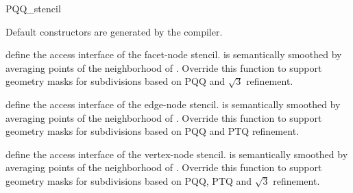 \begin{ccRefClass}{PQQ_stencil}







\ccCreation

Default constructors are generated by the compiler.


\ccThree{}{}{}

{define the access interface of the facet-node stencil. 
 is semantically smoothed by averaging points of the
neighborhood of .
Override this function to support geometry masks for subdivisions 
based on PQQ and $\sqrt{3}$ refinement.} 

{define the access interface of the edge-node stencil. 
 is semantically smoothed by averaging points of 
the neighborhood of .
Override this function to support geometry masks for subdivisions 
based on PQQ and PTQ refinement.} 

{define the access interface of the vertex-node stencil.
 is semantically smoothed by averaging points of 
the neighborhood of .
Override this function to support geometry masks for subdivisions 
based on PQQ, PTQ and $\sqrt{3}$ refinement.} 





\end{ccRefClass}
